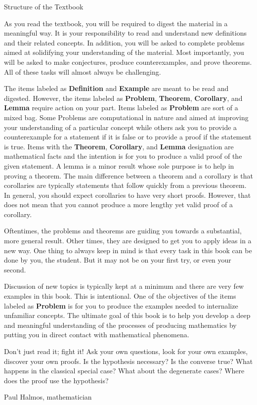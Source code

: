 \begin{section}{Structure of the Textbook}

As you read the textbook, you will be required to digest the material in a meaningful way.  It is your responsibility to read and understand new definitions and their related concepts.  In addition, you will be asked to complete problems aimed at solidifying your understanding of the material.  Most importantly, you will be asked to make conjectures, produce counterexamples, and prove theorems. All of these tasks will almost always be challenging.

The items labeled as \textbf{Definition} and \textbf{Example} are meant to be read and digested.  However, the items labeled as \textbf{Problem}, \textbf{Theorem}, \textbf{Corollary}, and \textbf{Lemma} require action on your part.  Items labeled as \textbf{Problem} are sort of a mixed bag. Some Problems are computational in nature and aimed at improving your understanding of a particular concept while others ask you to provide a counterexample for a statement if it is false or to provide a proof if the statement is true. Items with the \textbf{Theorem}, \textbf{Corollary}, and \textbf{Lemma} designation are mathematical facts and the intention is for you to produce a valid proof of the given statement.  A lemma is a minor result whose sole purpose is to help in proving a theorem. The main difference between a theorem and a corollary is that corollaries are typically statements that follow quickly from a previous theorem.  In general, you should expect corollaries to have very short proofs.  However, that does not mean that you cannot produce a more lengthy yet valid proof of a corollary.

Oftentimes, the problems and theorems are guiding you towards a substantial, more  general result. Other times, they are designed to get you to apply ideas in a new way. One thing to always keep in mind is that every task in this book can be done by you, the student. But it may not be on your first try, or even your second.

Discussion of new topics is typically kept at a minimum and there are very few examples in this book. This is intentional.  One of the objectives of the items labeled as \textbf{Problem} is for you to produce the examples needed to internalize unfamiliar concepts.  The ultimate goal of this book is to help you develop a deep and meaningful understanding of the processes of producing mathematics by putting you in direct contact with mathematical phenomena.

\epigraph{Don't just read it; fight it! Ask your own questions, look for your own examples, discover your own proofs. Is the hypothesis necessary? Is the converse true? What happens in the classical special case? What about the degenerate cases? Where does the proof use the hypothesis?}{Paul Halmos, mathematician}

\end{section}

